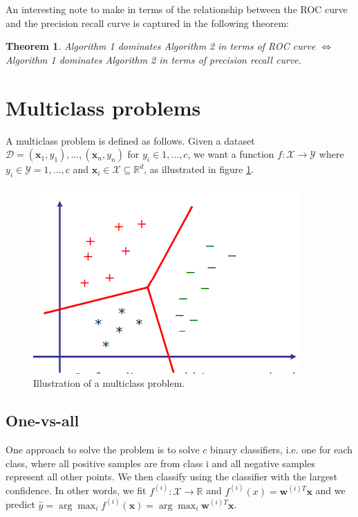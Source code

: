 \documentclass[a4paper,10pt,twoside]{article}
\newtheorem{theorem}{Theorem}
\begin{document}
An interesting note to make in terms of the relationship between the ROC curve and the precision recall curve is captured in the following theorem:

\begin{theorem}
    Algorithm 1 dominates Algorithm 2 in terms of ROC curve $\Leftrightarrow$ Algorithm 1 dominates Algorithm 2 in terms of precision recall curve.
\end{theorem}

\section{Multiclass problems}

A multiclass problem is defined as follows. Given a dataset $\mathcal{D}={(\mathbf{x}_1, y_1),\ldots, (\mathbf{x}_n, y_n)}$ for $y_i\in{1,\ldots, c}$, we want a function $f:\mathcal{X}\rightarrow \mathcal{Y}$ where $y_i\in\mathcal{Y}={1,\ldots,c}$ and $\mathbf{x}_i\in\mathcal{X}\subseteq\mathbb{R}^d$, as illustrated in figure \ref{multiclass-problem}.

\begin{figure}
    \centering
    \includegraphics[width=.5\textwidth]{figures/multiclass-problem.png}
    \caption{Illustration of a multiclass problem.}
    \label{multiclass-problem}
\end{figure}

\subsection{One-vs-all}

One approach to solve the problem is to solve $c$ binary classifiers, i.e. one for each class, where all positive samples are from class i and all negative samples represent all other points. We then classify using the classifier with the largest confidence. In other words, we fit $f^{(i)}:\mathcal{X}\rightarrow\mathbb{R}$ and $f^{(i)}(x)=\mathbf{w}^{(i)T}\mathbf{x}$ and we predict $\hat{y}=\arg\max_{i}f^{(i)}(\mathbf{x})=\arg\max_{i}\mathbf{w}^{(i)T}\mathbf{x}$. 
\end{document}
